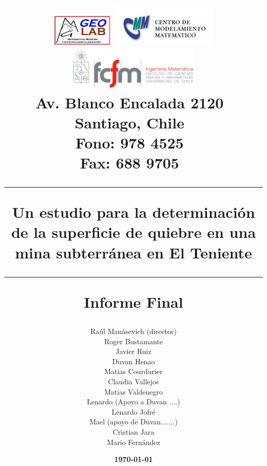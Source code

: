 \title{
\vskip -2cm
\includegraphics[height=1.5cm]{portada/figuras/logo_mmgeo}\hspace*{1.2cm}
\includegraphics[width=5cm]{./portada/figuras/logo_cmm} \hfill
\includegraphics[height=2cm]{./portada//figuras/logo_dim}\\
{\small Av. Blanco Encalada 2120 \hfill  \, \\
Santiago, Chile \hfill \, \\
Fono: 978 4525  \hfill \, \\
Fax: 688 9705  \hfill \, \\ }	
	\vspace{0.5in}
	\vspace{0.2in}
	\hrule
	\vspace{0.2in}
	\Huge Un estudio para la determinaci\'on de la superficie de quiebre en una mina subterr\'anea en El Teniente
	\vspace{0.2in}
	\hrule
	\vspace{0.2in}
	\LARGE Informe Final
}

\author{
	\large Ra\'ul Man\'asevich  (director)\\	
    \large Roger Bustamante\\
    \large Javier Ruiz\\
    \large Duvan Henao\\    
    \large Matias Courdurier\\
    \large Claudia Vallejos \\
    \large Matias Valdenegro \\
    \large Lenardo (Apoyo a Duvan ....) \\
    \large Lenardo Jofré \\
    \large Mael (apoyo de Duvan.......) \\    
    \large Cristian Jara\\
	\large Mario Fern\'andez\\
}

\date{\large\textbf{\today}}
